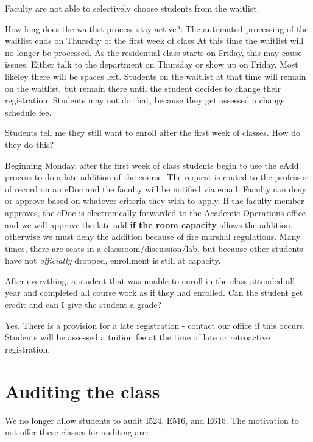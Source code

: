 Faculty are not able to selectively choose students from the waitlist.

How long does the waitlist process stay active?: The automated
processing of the waitlist ends on Thursday of the first week of class
At this time the waitlist will no longer be processed. 
As the residential class starts on Friday, this may cause
issues. Either talk to the department on Thursday or show up on
Friday. Most likeley there will be spaces left. 
Students on the waitlist at that time will remain on the waitlist, but remain there
until the student decides to change their registration. Students may not
do that, because they get assessed a change schedule fee.

Students tell me they still want to enroll after the first week of
classes. How do they do this?

Beginning Monday, after the first week of class students begin to use
the eAdd process to do a late addition of the course. The request is
routed to the professor of record on an eDoc and the faculty will be
notified via email. Faculty can deny or approve based on whatever
criteria they wish to apply. If the faculty member approves, the eDoc
is electronically forwarded to the Academic Operations office and we
will approve the late add \textbf{if the room capacity} allows the
addition, otherwise we must deny the addition because of fire marshal
regulations. Many times, there are seats in a
classroom/discussion/lab, but because other students have not
\emph{officially} dropped, enrollment is still at capacity.

After everything, a student that was unable to enroll in the class
attended all year and completed all course work as if they had enrolled.
Can the student get credit and can I give the student a grade?

Yes. There is a provision for a late registration - contact our office
if this occurs. Students will be assessed a tuition fee at the time of
late or retroactive registration.

\section{Auditing the class}\label{auditing-the-class}

We no longer allow students to audit I524, E516, and E616. The
motivation to not offer these classes for auditing are:


